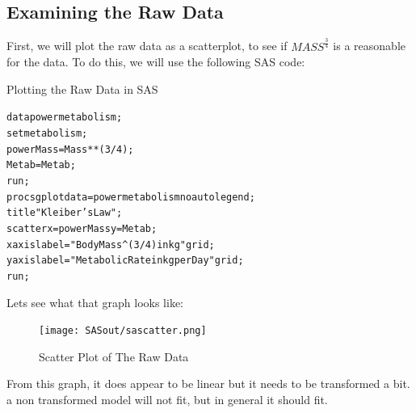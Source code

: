 \documentclass[english]{article}\usepackage[]{graphicx}\usepackage[]{color}
\makeatletter
\newenvironment{kframe}{%
 \def\at@end@of@kframe{}%
 \ifinner\ifhmode%
  \def\at@end@of@kframe{\end{minipage}}%
  \begin{minipage}{\columnwidth}%
 \fi\fi%
 \def\FrameCommand##1{\hskip\@totalleftmargin \hskip-\fboxsep
 \colorbox{shadecolor}{##1}\hskip-\fboxsep
     \hskip-\linewidth \hskip-\@totalleftmargin \hskip\columnwidth}%
 \MakeFramed {\advance\hsize-\width
   \@totalleftmargin\z@ \linewidth\hsize
   \@setminipage}}%
 {\par\unskip\endMakeFramed%
 \at@end@of@kframe}
\newenvironment{knitrout}{}{} %
\makeatother
\begin{document}
\subsection{Examining the Raw Data}
First, we will plot the raw data as a scatterplot, to see if $MASS^{\frac{3}{4}}$ is a reasonable for the data. To do this, we will use the following SAS code:
	\begin{Code}[H]
		\caption{Plotting the Raw Data in SAS}
\begin{center}
\begin{knitrout}
\color{fgcolor}\begin{kframe}
\begin{alltt}
data powermetabolism;
set metabolism;
powerMass=Mass**(3/4);
Metab=Metab;
run;
proc sgplot data=powermetabolism noautolegend;
title "Kleiber's Law";
scatter x=powerMass y=Metab;
xaxis label="Body Mass^(3/4) in kg" grid;
yaxis label="Metabolic Rate in kg per Day" grid;
run;
\end{alltt}
\end{kframe}
\end{knitrout}
\end{center}
\end{Code}
Lets see what that graph looks like:
\begin{figure}[H]
	\caption{Scatter Plot of The Raw Data}
	\label{fig:sasterplot1}
	\begin{center}
\texttt{[image: SASout/sascatter.png]}
\par\end{center}
\end{figure}

From this graph, it does appear to be linear but it needs to be transformed a bit. a non transformed model will not fit, but in general it should fit.
\end{document}
